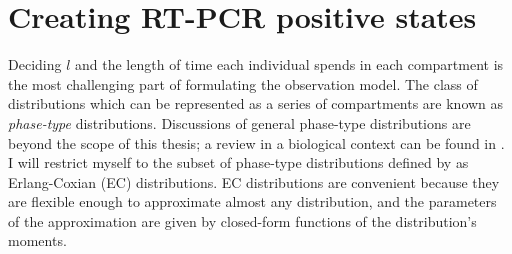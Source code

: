 \documentclass[thesis.tex]{subfiles}
\begin{document}
\chapter{Creating RT-PCR positive states} \label{transmission:sec:phase-type}

Deciding $l$ and the length of time each individual spends in each compartment is the most challenging part of formulating the observation model.
The class of distributions which can be represented as a series of compartments are known as \emph{phase-type} distributions.
Discussions of general phase-type distributions are beyond the scope of this thesis; a review in a biological context can be found in \textcite{hobolthPhasetype}.
I will restrict myself to the subset of phase-type distributions defined by \textcite{osogamiClosed} as Erlang-Coxian (EC) distributions.
EC distributions are convenient because they are flexible enough to approximate almost any distribution, and the parameters of the approximation are given by closed-form functions of the distribution's moments.

\end{document}
